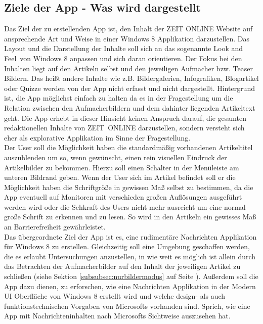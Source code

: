 \documentclass[12pt,a4paper,bibtotoc,abstracton]{scrartcl}
\begin{document}
\subsection{Ziele der App - Was wird dargestellt}
\label{subsec:zielderapp}
Das Ziel der zu erstellenden App ist, den Inhalt der ZEIT ONLINE Website auf ansprechende Art und Weise in einer Windows 8 Applikation darzustellen. Das Layout und die Darstellung der Inhalte soll sich an das sogenannte \glqq Look and Feel\grqq\ von Windows 8 anpassen und sich daran orientieren. Der Fokus bei den Inhalten liegt auf den Artikeln selbst und den jeweiligen Aufmacher bzw. Teaser Bildern. Das heißt andere Inhalte wie z.B. Bildergalerien, Infografiken, Blogartikel oder Quizze werden von der App nicht erfasst und nicht dargestellt. Hintergrund ist, die App möglichst einfach zu halten da es in der Fragestellung um die Relation zwischen den Aufmacherbildern und dem dahinter liegenden Artikeltext geht. Die App erhebt in dieser Hinsicht keinen Anspruch darauf, die gesamten redaktionellen Inhalte von \mbox{ZEIT ONLINE} darzustellen, sondern versteht sich eher als explorative Applikation im Sinne der Fragestellung.\\
Der User soll die Möglichkeit haben die standardmäßig vorhandenen Artikeltitel auszublenden um so, wenn gewünscht, einen rein visuellen Eindruck der Artikelbilder zu bekommen. Hierzu soll einen Schalter in der Menüleiste am unteren Bildrand geben. Wenn der User sich im Artikel befindet soll er die Möglichkeit haben die Schriftgröße in gewissen Maß selbst zu bestimmen, da die App eventuell auf Monitoren mit verschieden großen Auflösungen ausgeführt werden wird oder die Sehkraft des Users nicht mehr ausreicht um eine normal große Schrift zu erkennen und zu lesen. So wird in den Artikeln ein gewisses Maß an Barrierefreiheit gewährleistet.\\
Das übergeordnete Ziel der App ist es, eine rudimentäre Nachrichten Applikation für Windows 8 zu erstellen. Gleichzeitig soll eine Umgebung geschaffen werden, die es erlaubt Untersuchungen anzustellen, in wie weit es möglich ist allein durch das Betrachten der Aufmacherbilder auf den Inhalt der jeweiligen Artikel zu schließen (siehe Sektion \ref{subsubsec:nurbildermodus} auf Seite \pageref{subsubsec:nurbildermodus}). Außerdem soll die App dazu dienen, zu erforschen, wie eine Nachrichten Applikation in der Modern UI Oberfläche von Windows 8 erstellt wird und welche design- als auch funktionstechnischen Vorgaben von Microsofts vorhanden sind. Sprich, wie eine App mit Nachrichteninhalten nach Microsofts Sichtweise auszusehen hat. 
\end{document}
